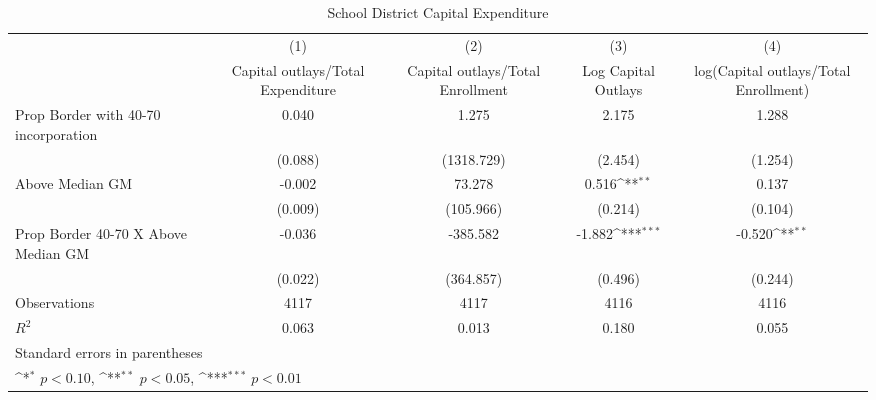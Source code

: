 \begin{table}[htbp]\centering
\def\sym#1{\ifmmode^{#1}\else\(^{#1}\)\fi}
\caption{School District Capital Expenditure}
\begin{tabular}{l*{4}{c}}
\hline\hline
                    &\multicolumn{1}{c}{(1)}&\multicolumn{1}{c}{(2)}&\multicolumn{1}{c}{(3)}&\multicolumn{1}{c}{(4)}\\
                    &\multicolumn{1}{c}{Capital outlays/Total Expenditure}&\multicolumn{1}{c}{Capital outlays/Total Enrollment}&\multicolumn{1}{c}{Log Capital Outlays}&\multicolumn{1}{c}{log(Capital outlays/Total Enrollment)}\\
\hline
Prop Border with 40-70 incorporation&       0.040         &       1.275         &       2.175         &       1.288         \\
                    &     (0.088)         &  (1318.729)         &     (2.454)         &     (1.254)         \\
[1em]
Above Median GM     &      -0.002         &      73.278         &       0.516\sym{**} &       0.137         \\
                    &     (0.009)         &   (105.966)         &     (0.214)         &     (0.104)         \\
[1em]
Prop Border 40-70 X Above Median GM&      -0.036         &    -385.582         &      -1.882\sym{***}&      -0.520\sym{**} \\
                    &     (0.022)         &   (364.857)         &     (0.496)         &     (0.244)         \\
\hline
Observations        &        4117         &        4117         &        4116         &        4116         \\
\(R^{2}\)           &       0.063         &       0.013         &       0.180         &       0.055         \\
\hline\hline
\multicolumn{5}{l}{\footnotesize Standard errors in parentheses}\\
\multicolumn{5}{l}{\footnotesize \sym{*} \(p<0.10\), \sym{**} \(p<0.05\), \sym{***} \(p<0.01\)}\\
\end{tabular}
\end{table}
